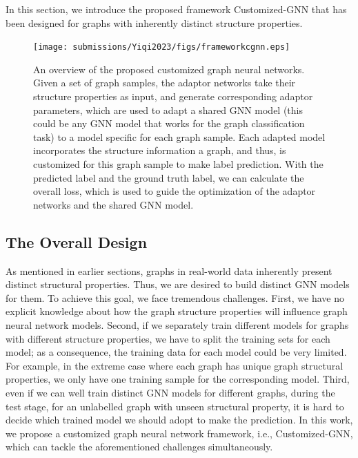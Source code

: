 \documentclass[11pt,dvipdfm]{article}
\begin{document}
In this section, we introduce the proposed framework Customized-GNN that has been designed for graphs with inherently distinct structure properties. 
\begin{figure}[!t]
\begin{center}
{\texttt{[image: submissions/Yiqi2023/figs/frameworkcgnn.eps]}}

\end{center}

\caption{An overview of the proposed customized graph neural networks. Given a set of graph samples, the adaptor networks take their structure properties as input, and generate corresponding adaptor parameters, which are used to adapt a shared GNN model (this could be any GNN model that works for the graph classification task) to a model specific for each graph sample. Each adapted model incorporates the structure information a graph, and thus, is customized for this graph sample to make label prediction. With the predicted label and the ground truth label, we can calculate the overall loss, which is used to guide the optimization of the adaptor networks and the shared GNN model.}

\label{fig:yiqi_model-frame}

\end{figure}

\subsection{The Overall Design}

As mentioned in earlier sections, graphs in real-world data inherently present distinct structural properties. Thus, we are desired to build distinct GNN models for them. To achieve this goal, we face tremendous challenges. First, we have no explicit knowledge about how the graph structure properties will influence graph neural network models. Second, if we separately train different models for graphs with different structure properties, we have to split the training sets for each model; as a consequence, the training data for each model could be very limited. For example, in the extreme case where each graph has unique graph structural properties, we only have one training sample for the corresponding model. Third, even if we can well train distinct GNN models for different graphs, during the test stage, for an unlabelled graph with unseen structural property, it is hard to decide which trained model we should adopt to make the prediction. In this work, we propose a customized graph neural network framework, i.e., Customized-GNN, which can tackle the aforementioned challenges simultaneously. 
\end{document}
